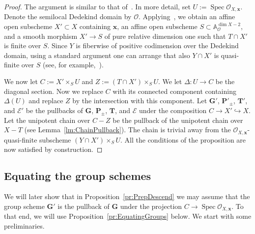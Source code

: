 \documentclass[11pt]{amsart}
\newcommand\A{\mathbb A}
\DeclareMathOperator\Spec{{Spec}}
\theoremstyle{plain}
\theoremstyle{definition}
\theoremstyle{remark}
\newcommand\cE{{\mathcal{E}}}
\newcommand\cO{{\mathcal{O}}}
\newcommand\bT{{\mathbf T}}
\newcommand\bG{{\mathbf G}}
\newcommand\bP{{\mathbf P}}
\newcommand\bx{{\mathbf x}}
\begin{document}
\begin{proof}
The argument is similar to that of~\cite[Prop.~4.2]{CesnaviciusGrSerre}. In more detail, set $U:=\Spec\cO_{X,\bx}$. Denote the semilocal Dedekind domain by $\cO$. Applying~\cite[Prop.~4.1]{CesnaviciusGrSerre}, we obtain an affine open subscheme $X'\subset X$ containing $\bx$, an affine open subscheme $S\subset\A_{\cO}^{\dim X-2}$, and a smooth morphism $X'\to S$ of pure relative dimension one such that $T\cap X'$ is finite over $S$. Since $Y$ is fiberwise of positive codimension over the Dedekind domain, using a standard argument one can arrange that also $Y\cap X'$ is quasi-finite over $S$ (see, for example,~\cite[Prop.~2.3]{FedorovCesnavicius}).

We now let $C:=X'\times_SU$ and $Z:=(T\cap X')\times_SU$. We let $\Delta\colon U\to C$ be the diagonal section. Now we replace $C$ with its connected component containing $\Delta(U)$ and replace $Z$ by the intersection with this component. Let $\bG'$, $\bP'_\pm$, $\bT'$, and $\cE'$ be the pullbacks of $\bG$, $\bP_\pm$, $\bT$, and $\cE$ under the composition $C\to X'\hookrightarrow X$. Let the unipotent chain over $C-Z$ be the pullback of the unipotent chain over $X-T$ (see Lemma~\ref{lm:ChainPullback}). The chain is trivial away from the $\cO_{X,\bx}$-quasi-finite subscheme $(Y\cap X')\times_SU$. All the conditions of the proposition are now satisfied by construction.
\end{proof}

\subsection{Equating the group schemes}\label{sect:Equating} We will later show that in Proposition~\ref{pr:PrepDescend} we may assume that the group scheme $\bG'$ is the pullback of $\bG$ under the projection $C\to\Spec\cO_{X,\bx}$. To that end, we will use Proposition~\ref{pr:EquatingGroups} below. We start with some preliminaries.
\end{document}
